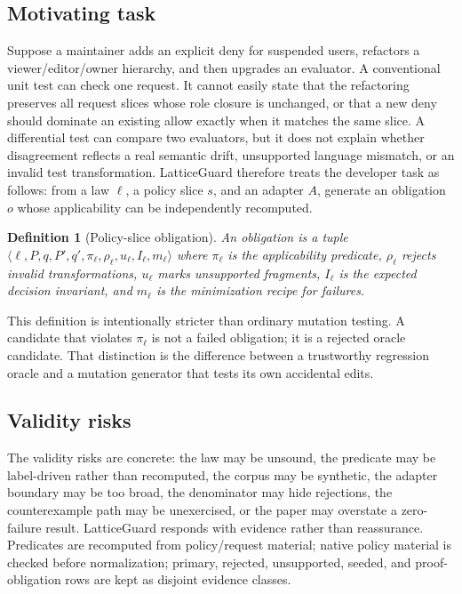 \documentclass[10pt,conference]{IEEEtran}
\newtheorem{definition}{Definition}
\begin{document}
\subsection{Motivating task}
Suppose a maintainer adds an explicit deny for suspended users, refactors a viewer/editor/owner hierarchy, and then upgrades an evaluator.  A conventional unit test can check one request.  It cannot easily state that the refactoring preserves all request slices whose role closure is unchanged, or that a new deny should dominate an existing allow exactly when it matches the same slice.  A differential test can compare two evaluators, but it does not explain whether disagreement reflects a real semantic drift, unsupported language mismatch, or an invalid test transformation.  LatticeGuard therefore treats the developer task as follows: from a law $\ell$, a policy slice $s$, and an adapter $A$, generate an obligation $o$ whose applicability can be independently recomputed.

\begin{definition}[Policy-slice obligation]
An obligation is a tuple
$\langle \ell,P,q,P',q',\pi_\ell,\rho_\ell,u_\ell,I_\ell,m_\ell\rangle$ where $\pi_\ell$ is the applicability predicate, $\rho_\ell$ rejects invalid transformations, $u_\ell$ marks unsupported fragments, $I_\ell$ is the expected decision invariant, and $m_\ell$ is the minimization recipe for failures.
\end{definition}

This definition is intentionally stricter than ordinary mutation testing.  A candidate that violates $\pi_\ell$ is not a failed obligation; it is a rejected oracle candidate.  That distinction is the difference between a trustworthy regression oracle and a mutation generator that tests its own accidental edits.

\subsection{Validity risks}
The validity risks are concrete: the law may be unsound, the predicate may be label-driven rather than recomputed, the corpus may be synthetic, the adapter boundary may be too broad, the denominator may hide rejections, the counterexample path may be unexercised, or the paper may overstate a zero-failure result.  LatticeGuard responds with evidence rather than reassurance.  Predicates are recomputed from policy/request material; native policy material is checked before normalization; primary, rejected, unsupported, seeded, and proof-obligation rows are kept as disjoint evidence classes.
\end{document}
